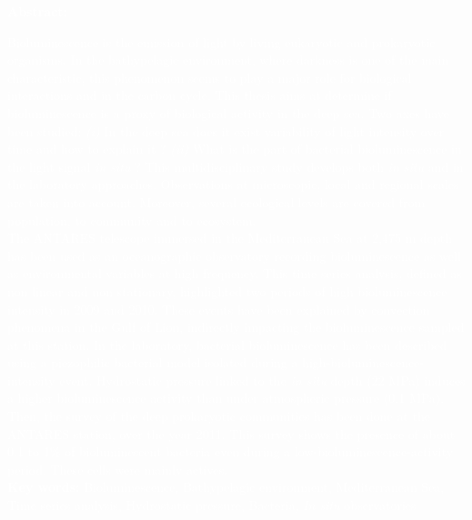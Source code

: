 
\thispagestyle{empty}


\textcolor{white}{\textbf{Abstract:}}
\vspace{5mm}

\normalsize{ \textcolor{white}{Bioluminescence is the emission of light by living eukaryotic and prokaryotic organisms. In the bathypelagic environment, where darkness is one of the main characteristic, this phenomenon seems to play a major role for biological interactions and in the carbon cycle. This thesis aims at determine if bioluminescence is a proxy of biological activity in the deep sea. Two axes have been studied\string: 
 \textit{(i)} In the deep sea does it exist variability of light intensity over time and how to explain it ? \textit{(ii)} What is the part of bacterial bioluminescence in the light signal \textit{in situ} ? This multidisciplinary study develops both \textit{in situ} and in the laboratory approaches. Observations at microscopic, local and regional scales are taken into account. Moreover, several ecological levels are covered from population, to community and to ecosystem.}} \\

\normalsize{\textcolor{white}{The ANTARES telescope immersed in the Mediterranean Sea at 2,475 m depth has been used as an oceanographic observatory recording bioluminescence as well as environmental variables at high frequency. This time series analysis, defined as non linear and non stationary, highlighted two periods of high bioluminescence intensity in 2009 and 2010. These events have been explained by convection phenomena in the Gulf of Lion, indirectly impacting the bioluminescence sampled at this station. In the laboratory, bacterial bioluminescence has been described using a piezophilic bacterial model isolated during a high-bioluminescence-intensity event. Hydrostatic pressure linked to the \textit{in situ} depth (22 MPa) induces a higher bioluminescence activity than under atmospheric pressure (0.1 MPa). Then, the survey of the deep prokaryotic communities has been done at the ANTARES station, over the year 2011. This survey shows the presence of about 0.1 to 1\% of bioluminescent bacteria even during a low-bioluminescence-activity period. These cells were mainly actives.}}\\

\textcolor{white}{\textbf{Key words:} Bioluminescence, Bathypelagic environment, Mediterranean Sea, Time series analysis, Hydrostatic pressure, Bacteria, \textit{In situ} observatories}\\


